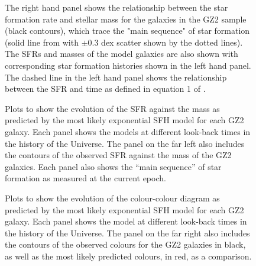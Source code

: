 \documentclass{mn2e}
\begin{document}
\begin{figure}
\caption{The right hand panel shows the relationship between the star formation rate and stellar mass for the galaxies in the GZ2 sample (black contours), which trace the "main sequence" of star formation (solid line from \cite{Peng} with $\pm0.3$ dex scatter shown by the dotted lines). The SFRs and masses of the model galaxies are also shown with corresponding star formation histories shown in the left hand panel. The dashed line in the left hand panel shows the relationship between the SFR and time as defined in equation 1 of \citet{Peng}.}
\label{sfr_mass}
\end{figure}

\begin{figure}
\caption{Plots to show the evolution of the SFR against the mass as predicted by the most likely exponential SFH model for each GZ2 galaxy. Each panel shows the models at different look-back times in the history of the Universe. The panel on the far left also includes the contours of the observed SFR against the mass of the GZ2 galaxies. Each panel also shows the ``main sequence'' of star formation as measured at the current epoch.}
\label{sfr_mass_evo}
\end{figure}

\begin{figure}
\caption{Plots to show the evolution of the colour-colour diagram as predicted by the most likely exponential SFH model for each GZ2 galaxy. Each panel shows the model at different look-back times in the history of the Universe. The panel on the far right also includes the contours of the observed colours for the GZ2 galaxies in black, as well as the most likely predicted colours, in red, as a comparison.}
\label{c_c_evo}
\end{figure}
\end{document}
